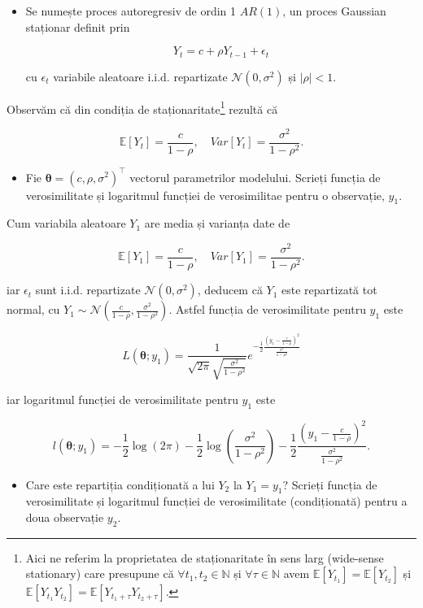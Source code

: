 \documentclass[]{article}
\let\rmarkdownfootnote\footnote%
\def\footnote{\protect\rmarkdownfootnote}
\newenvironment{frshaded*}{%
  \def\FrameCommand{\fboxrule=\FrameRule\fboxsep=\FrameSep \fcolorbox{framecolor}{shadecolor1}}%
  \MakeFramed {\advance\hsize-\width \FrameRestore}}%
{\endMakeFramed}
\newenvironment{rmdblock}[1]
  {\begin{frshaded*}
  \begin{itemize}
  \renewcommand{\labelitemi}{
    \raisebox{-.7\height}[0pt][0pt]{
      {\setkeys{Gin}{width=2em,keepaspectratio}\texttt{[image: images/icons/\#1]}}
    }
  }
  \item
  }
  {
  \end{itemize}
  \end{frshaded*}
  }
\newenvironment{rmdexercise}
  {\begin{rmdblock}{exercise}}
  {\end{rmdblock}}
\begin{document}
\begin{rmdexercise}
Se numește proces autoregresiv de ordin 1 \(AR(1)\), un proces Gaussian
staționar definit prin

\[
  Y_t = c + \rho Y_{t-1} + \epsilon_{t}
\]

cu \(\epsilon_{t}\) variabile aleatoare i.i.d. repartizate
\(\mathcal{N}(0,\sigma^2)\) și \(|\rho|<1\).
\end{rmdexercise}

Observăm că din condiția de staționaritate\footnote{Aici ne referim la
  proprietatea de staționaritate în sens larg (wide-sense stationary)
  care presupune că \(\forall t_1,t_2\in\mathbb{N}\) și
  \(\forall \tau\in\mathbb{N}\) avem
  \(\mathbb{E}[Y_{t_1}] = \mathbb{E}[Y_{t_2}]\) și
  \(\mathbb{E}[Y_{t_1}Y_{t_2}] = \mathbb{E}[Y_{t_1+\tau}Y_{t_2+\tau}]\).}
rezultă că

\[
  \mathbb{E}[Y_t] = \frac{c}{1-\rho} ,\quad Var[Y_t] = \frac{\sigma^2}{1-\rho^2}.
\]

\begin{rmdexercise}
Fie \(\mathbf{\theta} = (c, \rho, \sigma^2)^\intercal\) vectorul
parametrilor modelului. Scrieți funcția de verosimilitate și logaritmul
funcției de verosimilitae pentru o observație, \(y_1\).
\end{rmdexercise}

Cum variabila aleatoare \(Y_1\) are media și varianța date de

\[
  \mathbb{E}[Y_1] = \frac{c}{1-\rho} ,\quad Var[Y_1] = \frac{\sigma^2}{1-\rho^2}.
\]

iar \(\epsilon_t\) sunt i.i.d. repartizate \(\mathcal{N}(0,\sigma^2)\),
deducem că \(Y_1\) este repartizată tot normal, cu
\(Y_1\sim\mathcal{N}\left(\frac{c}{1-\rho}, \frac{\sigma^2}{1-\rho^2}\right)\).
Astfel funcția de verosimilitate pentru \(y_1\) este

\[
  L(\mathbf{\theta};y_1) = \frac{1}{\sqrt{2\pi}\sqrt{\frac{\sigma^2}{1-\rho^2}}}e^{-\frac{1}{2}\frac{\left(y_1 - \frac{c}{1-\rho}\right)^2}{\frac{\sigma^2}{1-\rho^2}}}
\]

iar logaritmul funcției de verosimilitate pentru \(y_1\) este

\[
  l(\mathbf{\theta};y_1) = -\frac{1}{2}\log(2\pi) - \frac{1}{2}\log\left(\frac{\sigma^2}{1-\rho^2}\right) -\frac{1}{2}\frac{\left(y_1 - \frac{c}{1-\rho}\right)^2}{\frac{\sigma^2}{1-\rho^2}}.
\]

\begin{rmdexercise}
Care este repartiția condiționată a lui \(Y_2\) la \(Y_1 = y_1\)?
Scrieți funcția de verosimilitate și logaritmul funcției de
verosimilitate (condiționată) pentru a doua observație \(y_2\).
\end{rmdexercise}
\end{document}
